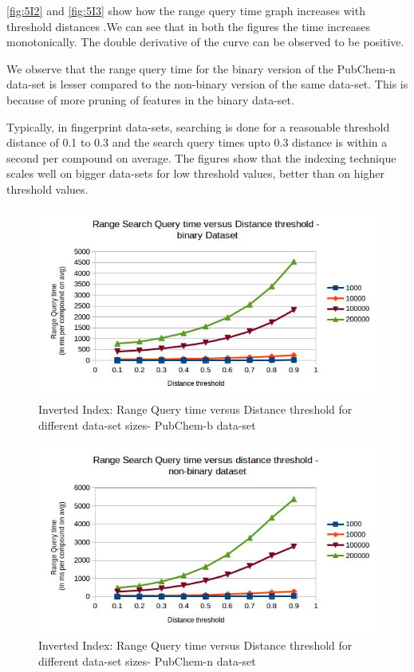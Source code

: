 \autoref{fig:5I2} and \autoref{fig:5I3} show how the range query time graph increases with threshold distances .We can see that in both the figures the time increases monotonically. The double derivative of the curve can be observed to be positive. 

We observe that the range query time for the binary version of the PubChem-n data-set is lesser compared to the non-binary version of the same data-set. This is because of more pruning of features in the binary data-set.

Typically, in fingerprint data-sets, searching is done for a reasonable threshold distance of 0.1 to 0.3 and the search query times upto 0.3 distance is within a second per compound on average. The figures show that the indexing technique scales well on bigger data-sets for low threshold values, better than on higher threshold values.


\begin{figure}[ht]	
\centering
\includegraphics[width=1 \columnwidth]{img/imageI2.jpg}
\caption{Inverted Index: Range Query time versus Distance threshold for different data-set sizes- PubChem-b data-set}
\label{fig:5I2}
\end{figure}

\begin{figure}[ht!]	
\centering
\includegraphics[width=1 \columnwidth]{img/imageI3.jpg}
\caption{Inverted Index: Range Query time versus Distance threshold for different data-set sizes- PubChem-n data-set}
\label{fig:5I3}
\end{figure}

